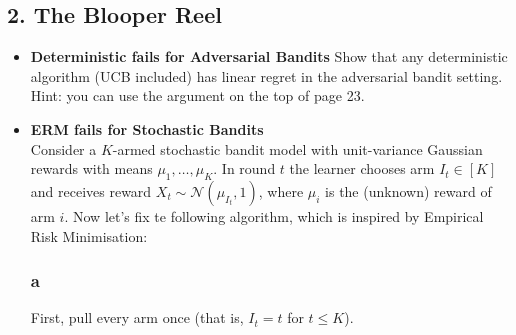 \documentclass[10pt, a4paper, twoside]{amsart}
\theoremstyle{plain}
\begin{document}
\subsection*{2. The Blooper Reel}
\begin{itemize}
    \item \textbf{Deterministic fails for Adversarial Bandits} Show that any deterministic algorithm (UCB included) has linear regret in the adversarial bandit setting. Hint: you can use the argument on the top of page 23.
    \item \textbf{ERM fails for Stochastic Bandits} \\
    Consider a $K$-armed stochastic bandit model with unit-variance Gaussian rewards with means $\mu_1,\ldots ,\mu_K$. In round $t$ the learner chooses arm $I_t \in [K]$ and receives reward $X_t \sim \mathcal{N}(\mu_{I_t}, 1)$, where $\mu_i$ is the (unknown) reward of arm $i$. Now let's fix te following algorithm, which is inspired by Empirical Risk Minimisation:
    \subsubsection*{a} First, pull every arm once (that is, $I_t = t$ for $t \leq K$).

\end{itemize}
\end{document}
